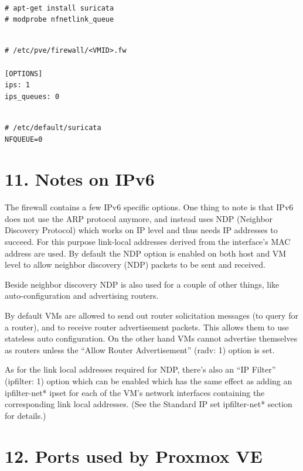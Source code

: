 \begin{lstlisting}

# apt-get install suricata
# modprobe nfnetlink_queue

\end{lstlisting}

\begin{lstlisting}

# /etc/pve/firewall/<VMID>.fw

[OPTIONS]
ips: 1
ips_queues: 0

\end{lstlisting}

\begin{lstlisting}

# /etc/default/suricata
NFQUEUE=0

\end{lstlisting}


\section{11. Notes on IPv6}

The firewall contains a few IPv6 specific options. One thing to note is that IPv6 does not use the ARP protocol anymore, and instead uses NDP (Neighbor Discovery Protocol) which works on IP level and thus needs IP addresses to succeed. For this purpose link-local addresses derived from the interface’s MAC address are used. By default the NDP option is enabled on both host and VM level to allow neighbor discovery (NDP) packets to be sent and received.

Beside neighbor discovery NDP is also used for a couple of other things, like auto-configuration and advertising routers.

By default VMs are allowed to send out router solicitation messages (to query for a router), and to receive router advertisement packets. This allows them to use stateless auto configuration. On the other hand VMs cannot advertise themselves as routers unless the “Allow Router Advertisement” (radv: 1) option is set.

As for the link local addresses required for NDP, there’s also an “IP Filter” (ipfilter: 1) option which can be enabled which has the same effect as adding an ipfilter-net* ipset for each of the VM’s network interfaces containing the corresponding link local addresses. (See the Standard IP set ipfilter-net* section for details.)


\section{12. Ports used by Proxmox VE}

